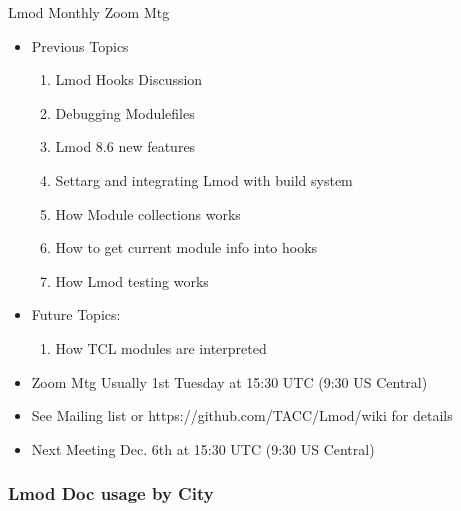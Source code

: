 \documentclass{beamer}
\begin{document}
\begin{frame}{Lmod Monthly Zoom Mtg}
  \begin{itemize}
    \item Previous Topics
      \begin{enumerate}
        \item Lmod Hooks Discussion
        \item Debugging Modulefiles
        \item Lmod 8.6 new features
        \item Settarg and integrating Lmod with build system
        \item How Module collections works 
        \item How to get current module info into hooks
        \item How Lmod testing works
      \end{enumerate}
    \item Future Topics: 
      \begin{enumerate}
        \item How TCL modules are interpreted
      \end{enumerate}
    \item Zoom Mtg Usually 1st Tuesday at 15:30 UTC (9:30 US Central)
    \item See Mailing list or https://github.com/TACC/Lmod/wiki for
      details
    \item Next Meeting Dec. 6th at 15:30 UTC (9:30 US Central)
  \end{itemize}
\end{frame}

\begin{frame}[fragile]
    \frametitle{Lmod Doc usage by City}
\end{frame}
\end{document}
